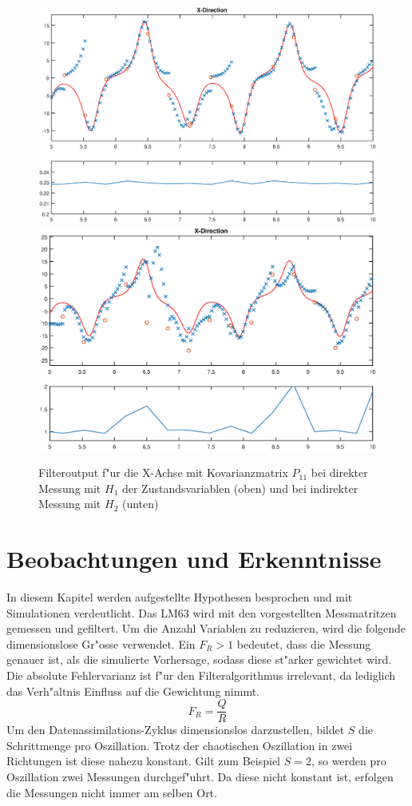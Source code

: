 \begin{refsection}
\begin{figure}
\centering
\includegraphics[width=\hsize]{kalman/figures/H1R10S2XP.eps}
\includegraphics[width=\hsize]{kalman/figures/H2R10S2XP.eps}
\caption{Filteroutput f"ur die X-Achse mit Kovarianzmatrix $P_{11}$ bei direkter Messung mit $H_{1}$ der Zustandsvariablen (oben) und bei indirekter Messung mit $H_{2}$ (unten)}
\label{skript:Kovarianz}
\end{figure}

\section{Beobachtungen und Erkenntnisse}
In diesem Kapitel werden aufgestellte Hypothesen besprochen und mit Simulationen verdeutlicht. Das LM63 wird mit den vorgestellten Messmatritzen gemessen und gefiltert. Um die Anzahl Variablen zu reduzieren, wird die folgende dimensionslose Gr"osse verwendet. Ein $F_{R}>1$ bedeutet, dass die Messung genauer ist, als die simulierte Vorhersage, sodass diese st"arker gewichtet wird. Die absolute Fehlervarianz ist f"ur den Filteralgorithmus irrelevant, da lediglich das Verh"altnis Einfluss auf die Gewichtung nimmt.
\[
F_{R}=\frac{Q}{R}
\]
Um den Datenassimilations-Zyklus dimensionslos darzustellen, bildet $S$ die Schrittmenge pro Oszillation. Trotz der chaotischen Oszillation in zwei Richtungen ist diese nahezu konstant. Gilt zum Beispiel $S=2$, so werden pro Oszillation zwei Messungen durchgef"uhrt. Da diese nicht konstant ist, erfolgen die Messungen nicht immer am selben Ort.


\end{refsection}

